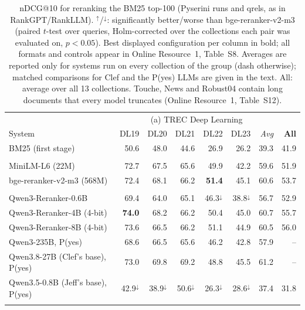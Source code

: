 \begin{table}[p]
\centering
\footnotesize
\setlength{\tabcolsep}{2.6pt}
\caption{nDCG@10 for reranking the BM25 top-100 (Pyserini runs and qrels, as in RankGPT/RankLLM). $^\uparrow$/$^\downarrow$: significantly better/worse than bge-reranker-v2-m3 (paired $t$-test over queries, Holm-corrected over the collections each pair was evaluated on, $p<0.05$). Best displayed configuration per column in bold; all formats and controls appear in Online Resource~1, Table~S8. Averages are reported only for systems run on every collection of the group (dash otherwise); matched comparisons for Clef and the P(yes) LLMs are given in the text. All: average over all 13 collections. Touche, News and Robust04 contain long documents that every model truncates (Online Resource~1, Table~S12).}
\label{tab:ranking}
\begin{tabular}{lrrrrr|r|r}
\toprule
 & \multicolumn{6}{c|}{(a) TREC Deep Learning} & \\
System & DL19 & DL20 & DL21 & DL22 & DL23 & \textit{Avg} & \textbf{All} \\
\midrule
BM25 (first stage) & 50.6 & 48.0 & 44.6 & 26.9 & 26.2 & 39.3 & 41.9 \\
\addlinespace[1pt]
\multicolumn{8}{l}{\textit{Cross-encoders}} \\
MiniLM-L6 (22M) & 72.7 & 67.5 & 65.6 & 49.9 & 42.2 & 59.6 & 51.9 \\
bge-reranker-v2-m3 (568M) & 72.4 & 68.1 & 66.2 & \textbf{51.4} & 45.1 & 60.6 & 53.7 \\
\addlinespace[1pt]
\multicolumn{8}{l}{\textit{Label-probability LLM rerankers}} \\
Qwen3-Reranker-0.6B & 69.4 & 64.0 & 65.1 & 46.3$^\downarrow$ & 38.8$^\downarrow$ & 56.7 & 52.9 \\
Qwen3-Reranker-4B (4-bit) & \textbf{74.0} & 68.2 & 66.2 & 50.4 & 45.0 & 60.7 & 55.7 \\
Qwen3-Reranker-8B (4-bit) & 73.6 & 66.5 & 66.2 & 51.1 & 44.9 & 60.5 & 56.0 \\
Qwen3-235B, P(yes) & 68.6 & 66.5 & 65.6 & 46.2 & 42.8 & 57.9 & -- \\
Qwen3.8-27B (Clef's base), P(yes) & 73.0 & 69.8 & 69.2 & 48.8 & 45.5 & 61.2 & -- \\
Qwen3.5-0.8B (Jeff's base), P(yes) & 42.9$^\downarrow$ & 38.9$^\downarrow$ & 50.6$^\downarrow$ & 26.3$^\downarrow$ & 28.6$^\downarrow$ & 37.4 & 31.8 \\
\addlinespace[1pt]
\multicolumn{8}{l}{\textit{Laya (421M)}} \\

\end{tabular}
\end{table}
